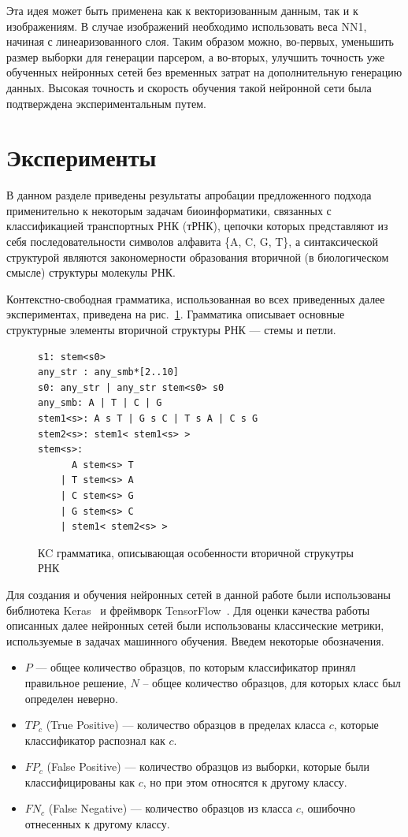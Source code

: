 \documentclass[14pt]{matmex-diploma-custom}
\begin{document}
Эта идея может быть применена как к векторизованным данным, так и к изображениям. В случае изображений необходимо использовать веса NN1, начиная с линеаризованного слоя. Таким образом можно, во-первых, уменьшить размер выборки для генерации парсером, а во-вторых, улучшить точность уже обученных нейронных сетей без временных затрат на дополнительную генерацию данных. Высокая точность и скорость обучения такой нейронной сети была подтверждена экспериментальным путем. 

\section{Эксперименты}
В данном разделе приведены результаты апробации предложенного подхода применительно к некоторым задачам биоинформатики, связанных с классификацией транспортных РНК (тРНК), цепочки которых представляют из себя последовательности символов алфавита \{A, C, G, T\}, а синтаксической структурой являются закономерности образования вторичной (в биологическом смысле) структуры молекулы РНК. 

Контекстно-свободная грамматика, использованная во всех приведенных далее экспериментах, приведена на рис.~\ref{rna}. Грамматика описывает основные структурные элементы вторичной структуры РНК --- стемы и петли.
\begin{figure} [h]
\begin{verbatim}
s1: stem<s0>
any_str : any_smb*[2..10]
s0: any_str | any_str stem<s0> s0
any_smb: A | T | C | G
stem1<s>: A s T | G s C | T s A | C s G 
stem2<s>: stem1< stem1<s> >
stem<s>:  
      A stem<s> T 
    | T stem<s> A 
    | C stem<s> G 
    | G stem<s> C 
    | stem1< stem2<s> >  
\end{verbatim}
\caption{КC грамматика, описывающая особенности вторичной струкутры РНК}
\label{rna}
\end{figure}

Для создания и обучения нейронных сетей в данной работе были использованы библиотека Keras~\cite{keras} и фреймворк TensorFlow~\cite{tensorflow}.
Для оценки качества работы описанных далее нейронных сетей были использованы классические метрики, используемые в задачах машинного обучения. Введем некоторые обозначения.
\begin{itemize}
    \item $P$ --- общее количество образцов, по которым классификатор принял правильное решение, $N$ -- общее количество образцов, для которых класс был определен неверно.
    \item $TP_{c}$ (True Positive) --- количество образцов в пределах класса $c$, которые классификатор распознал как $c$.
    \item $FP_{c}$ (False Positive) --- количество образцов из выборки, которые были классифицированы как $c$, но при этом относятся к другому классу.
    \item $FN_{c}$ (False Negative) --- количество образцов из класса $c$, ошибочно отнесенных к другому классу.
\end{itemize}
\end{document}
